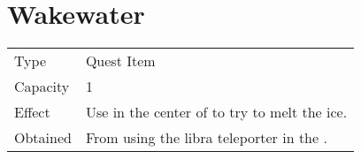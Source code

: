\section{Wakewater}
\label{item:wakewater}


\noindent\begin{tabularx}{\textwidth}[l]{lX}
	Type
	& Quest Item
\\
	Capacity
	& 1
\\
	Effect
	& Use in the center of \nameref{map:aquaria} to try to melt the ice.
\\
	Obtained
	& From \nameref{map:life_temple} using the libra teleporter in the \nameref{map:libra_temple}.
\end{tabularx}
